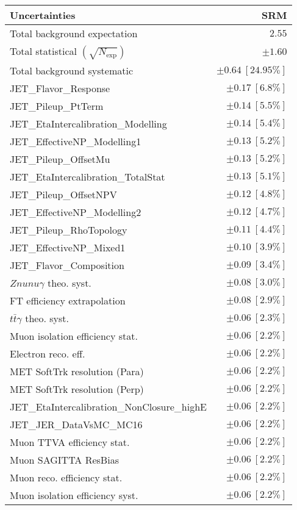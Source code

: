 \begin{tabular}{lr}
\hline
\textbf{Uncertainties} & \textbf{SRM} \\
\hline
Total background expectation & $2.55$ \\
\hline
Total statistical $(\sqrt{N_\mathrm{exp}})$ & $\pm 1.60$ \\
Total background systematic & $\pm 0.64\ [24.95\%]$ \\
\hline
\hline
JET\_Flavor\_Response & $\pm 0.17\ [6.8\%]$ \\
JET\_Pileup\_PtTerm & $\pm 0.14\ [5.5\%]$ \\
JET\_EtaIntercalibration\_Modelling & $\pm 0.14\ [5.4\%]$ \\
JET\_EffectiveNP\_Modelling1 & $\pm 0.13\ [5.2\%]$ \\
JET\_Pileup\_OffsetMu & $\pm 0.13\ [5.2\%]$ \\
JET\_EtaIntercalibration\_TotalStat & $\pm 0.13\ [5.1\%]$ \\
JET\_Pileup\_OffsetNPV & $\pm 0.12\ [4.8\%]$ \\
JET\_EffectiveNP\_Modelling2 & $\pm 0.12\ [4.7\%]$ \\
JET\_Pileup\_RhoTopology & $\pm 0.11\ [4.4\%]$ \\
JET\_EffectiveNP\_Mixed1 & $\pm 0.10\ [3.9\%]$ \\
JET\_Flavor\_Composition & $\pm 0.09\ [3.4\%]$ \\
$Znunu\gamma$ theo. syst. & $\pm 0.08\ [3.0\%]$ \\
FT efficiency extrapolation & $\pm 0.08\ [2.9\%]$ \\
$t\bar{t}\gamma$ theo. syst. & $\pm 0.06\ [2.3\%]$ \\
Muon isolation efficiency stat. & $\pm 0.06\ [2.2\%]$ \\
Electron reco. eff. & $\pm 0.06\ [2.2\%]$ \\
MET SoftTrk resolution (Para) & $\pm 0.06\ [2.2\%]$ \\
MET SoftTrk resolution (Perp) & $\pm 0.06\ [2.2\%]$ \\
JET\_EtaIntercalibration\_NonClosure\_highE & $\pm 0.06\ [2.2\%]$ \\
JET\_JER\_DataVsMC\_MC16 & $\pm 0.06\ [2.2\%]$ \\
Muon TTVA efficiency stat. & $\pm 0.06\ [2.2\%]$ \\
Muon SAGITTA ResBias & $\pm 0.06\ [2.2\%]$ \\
Muon reco. efficiency stat. & $\pm 0.06\ [2.2\%]$ \\
Muon isolation efficiency syst. & $\pm 0.06\ [2.2\%]$ \\

\end{tabular}

